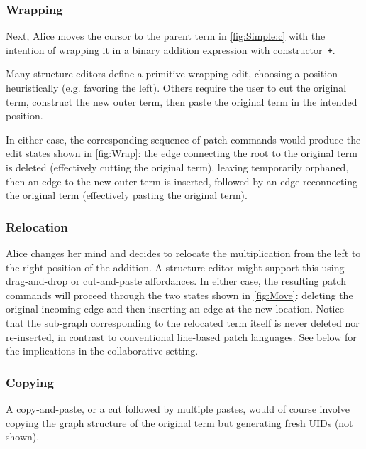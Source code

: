 \subsubsection{Wrapping}%
\label{sub:Wrapping}

Next, Alice moves the cursor to the parent term \vSimpleTimes{} in \autoref{fig:Simple:c}
with the intention of wrapping it in a binary addition expression with constructor~\texttt{+}.

Many structure editors define a primitive wrapping edit, choosing a position heuristically (e.g. favoring the left). Others 
require the user to cut the original term, construct the new outer term, then paste
the original term in the intended position. 

In either case, the corresponding sequence of patch commands would produce the edit states shown in \autoref{fig:Wrap}: the edge connecting the root to the original term is deleted (effectively cutting the original term), leaving \vSimpleTimes{} temporarily orphaned, then an edge to the new outer term is inserted, followed by an edge reconnecting the original term (effectively pasting the original term).

\subsubsection{Relocation}%
\label{sub:Repositioning}

Alice changes her mind and decides to relocate the multiplication from the left to the right position of the addition. A structure editor might support this using drag-and-drop or cut-and-paste affordances. In either case, the resulting patch commands will proceed through the two states shown in \autoref{fig:Move}: deleting the original incoming edge and then inserting an edge at the new location. Notice that the sub-graph corresponding to the relocated term itself is never deleted nor re-inserted, in contrast to conventional line-based patch languages.
See below for the implications in the collaborative setting.

\subsubsection{Copying} 
\label{sub:Copy}
A copy-and-paste, or a cut followed by multiple pastes, would of course involve copying the graph structure of the original term but generating fresh UIDs (not shown).



